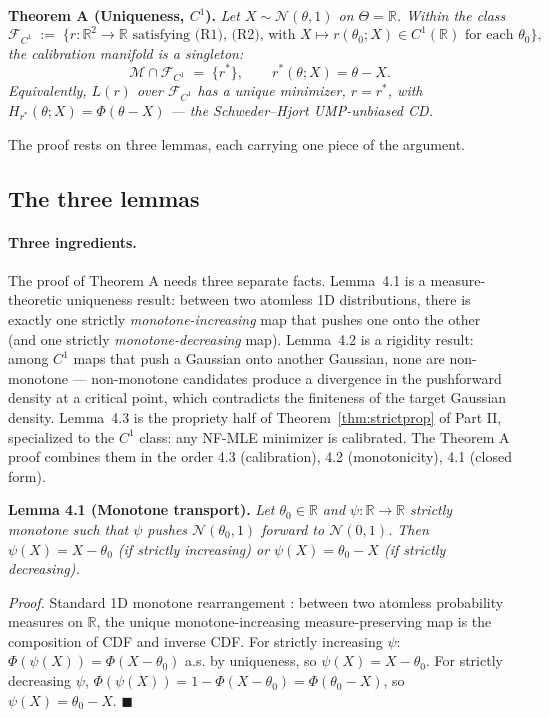 \documentclass[11pt]{article}
\begin{document}
\textbf{Theorem A (Uniqueness, \(C^1\)).} \emph{Let
\(X \sim \mathcal{N}(\theta, 1)\) on \(\Theta = \mathbb{R}\). Within the
class} \[
\mathcal{F}_{C^1} \;:=\; \bigl\{ r : \mathbb{R}^2 \to \mathbb{R} \text{ satisfying (R1), (R2), with } X \mapsto r(\theta_0; X) \in C^1(\mathbb{R}) \text{ for each } \theta_0 \bigr\},
\] \emph{the calibration manifold is a singleton:} \[
\mathcal{M} \cap \mathcal{F}_{C^1} \;=\; \{r^*\}, \qquad r^*(\theta; X) = \theta - X.
\] \emph{Equivalently, \(L(r)\) over \(\mathcal{F}_{C^1}\) has a unique
minimizer, \(r = r^*\), with \(H_{r^*}(\theta; X) = \Phi(\theta - X)\)
--- the Schweder--Hjort UMP-unbiased CD.}

The proof rests on three lemmas, each carrying one piece of the
argument.

\subsection{The three lemmas}\label{subsec:4.2}

\paragraph{Three ingredients.} The proof of Theorem A needs three
separate facts. Lemma~4.1 is a measure-theoretic uniqueness result:
between two atomless 1D distributions, there is exactly one strictly
\emph{monotone-increasing} map that pushes one onto the other (and one
strictly \emph{monotone-decreasing} map). Lemma~4.2 is a rigidity
result: among \(C^1\) maps that push a Gaussian onto another Gaussian,
none are non-monotone --- non-monotone candidates produce a divergence
in the pushforward density at a critical point, which contradicts the
finiteness of the target Gaussian density. Lemma~4.3 is the propriety
half of Theorem~\ref{thm:strictprop} of Part II, specialized to the
\(C^1\) class: any NF-MLE minimizer is calibrated. The Theorem A proof
combines them in the order 4.3 (calibration), 4.2 (monotonicity), 4.1
(closed form).

\textbf{Lemma 4.1 (Monotone transport).} \emph{Let
\(\theta_0 \in \mathbb{R}\) and \(\psi: \mathbb{R} \to \mathbb{R}\)
strictly monotone such that \(\psi\) pushes \(\mathcal{N}(\theta_0, 1)\)
forward to \(\mathcal{N}(0,1)\). Then \(\psi(X) = X - \theta_0\) (if
strictly increasing) or \(\psi(X) = \theta_0 - X\) (if strictly
decreasing).}

\emph{Proof.} Standard 1D monotone rearrangement \citep[ch.~2]{Villani2003}:
between two atomless probability measures on \(\mathbb{R}\), the unique
monotone-increasing measure-preserving map is the composition of CDF
and inverse CDF. For
strictly increasing \(\psi\): \(\Phi(\psi(X)) = \Phi(X - \theta_0)\)
a.s. by uniqueness, so \(\psi(X) = X - \theta_0\). For strictly
decreasing \(\psi\),
\(\Phi(\psi(X)) = 1 - \Phi(X - \theta_0) = \Phi(\theta_0 - X)\), so
\(\psi(X) = \theta_0 - X\). \(\blacksquare\)
\end{document}

